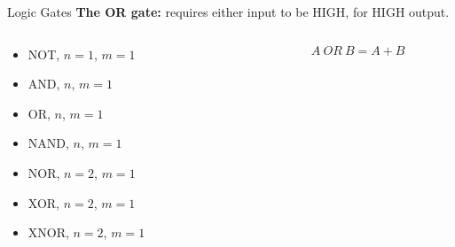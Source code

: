 \documentclass{beamer}
\begin{document}
\begin{frame}{Logic Gates}
\textbf{The OR gate:} requires either input to be HIGH, for HIGH output. \\ \vspace{0.5cm}
\begin{columns}[T]
\begin{column}{0.5\textwidth}
\begin{itemize}
\item \alert{NOT, $n=1$, $m=1$}
\item \alert{AND, $n$, $m=1$}
\item \alert{OR, $n$, $m=1$}
\item NAND, $n$, $m=1$
\item NOR, $n=2$, $m=1$
\item XOR, $n=2$, $m=1$
\item XNOR, $n=2$, $m=1$
\end{itemize}
\end{column}
\begin{column}{0.5\textwidth}
\begin{equation}
A ~ OR ~ B = A+B
\end{equation}
\end{column}
\end{columns}
\end{frame}
\end{document}
